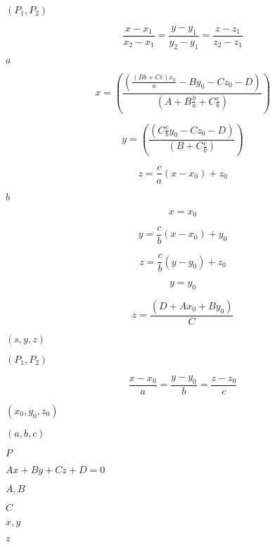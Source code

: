 \documentclass{article}
\begin{document}
$ ( P_1, P_2) $
\pagebreak

\[ \frac {x - x_1 } {x_2 - x_1} = \frac { y - y_1 } {y_2 - y_1} = \frac { z - z_1 } {z_2 - z_1} \]
\pagebreak

$ a $
\pagebreak

\[ x = \left ( { \frac {\left ( \frac { ( B b + C c) x_0} {a} - B y_0 - C z_0 - D \right)} { ( A + B \frac {b} {a} + C \frac{c} {b})} }\right) \]
\pagebreak

\[ y = \left ( { \frac {\left ( C \frac {c}{b} y_0 - C z_0 - D \right)} { ( B + C \frac {c} {b}) } }\right) \]
\pagebreak

\[ z = \frac{c} {a} (x - x_0) + z_0 \]
\pagebreak

$ b $
\pagebreak

\[ x = x_0 \]
\pagebreak

\[ y = \frac{c} {b} (x - x_0) + y_0 \]
\pagebreak

\[ z = \frac{c} {b} (y - y_0) + z_0 \]
\pagebreak

\[ y = y_0 \]
\pagebreak

\[ z = \frac{(D + A x_0 + B y_0)} {C} \]
\pagebreak

$ (s, y, z) $
\pagebreak

$ (P_1, P_2) $
\pagebreak

\[ \frac {x - x_0 } {a} = \frac { y - y_0 } {b} = \frac { z - z_0 } {c} \]
\pagebreak

$ (x_0, y_0, z_0) $
\pagebreak

$ (a, b, c) $
\pagebreak

$ P $
\pagebreak

$ Ax + By + Cz + D = 0 $
\pagebreak

$ A, B $
\pagebreak

$ C $
\pagebreak

$ x, y $
\pagebreak

$ z $
\pagebreak
\end{document}
